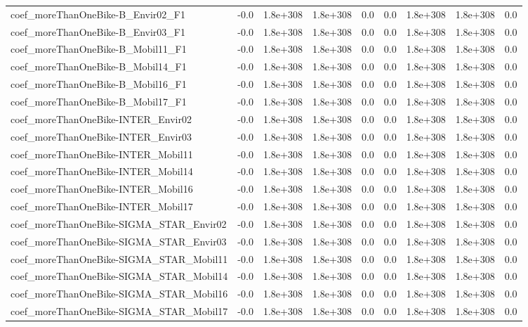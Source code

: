 \begin{tabular}{lrrrrrrrr}
coef_moreThanOneBike-B_Envir02_F1 & -0.0 & 1.8e+308 & 1.8e+308 & 0.0 & 0.0 & 1.8e+308 & 1.8e+308 & 0.0 \\
coef_moreThanOneBike-B_Envir03_F1 & -0.0 & 1.8e+308 & 1.8e+308 & 0.0 & 0.0 & 1.8e+308 & 1.8e+308 & 0.0 \\
coef_moreThanOneBike-B_Mobil11_F1 & -0.0 & 1.8e+308 & 1.8e+308 & 0.0 & 0.0 & 1.8e+308 & 1.8e+308 & 0.0 \\
coef_moreThanOneBike-B_Mobil14_F1 & -0.0 & 1.8e+308 & 1.8e+308 & 0.0 & 0.0 & 1.8e+308 & 1.8e+308 & 0.0 \\
coef_moreThanOneBike-B_Mobil16_F1 & -0.0 & 1.8e+308 & 1.8e+308 & 0.0 & 0.0 & 1.8e+308 & 1.8e+308 & 0.0 \\
coef_moreThanOneBike-B_Mobil17_F1 & -0.0 & 1.8e+308 & 1.8e+308 & 0.0 & 0.0 & 1.8e+308 & 1.8e+308 & 0.0 \\
coef_moreThanOneBike-INTER_Envir02 & -0.0 & 1.8e+308 & 1.8e+308 & 0.0 & 0.0 & 1.8e+308 & 1.8e+308 & 0.0 \\
coef_moreThanOneBike-INTER_Envir03 & -0.0 & 1.8e+308 & 1.8e+308 & 0.0 & 0.0 & 1.8e+308 & 1.8e+308 & 0.0 \\
coef_moreThanOneBike-INTER_Mobil11 & -0.0 & 1.8e+308 & 1.8e+308 & 0.0 & 0.0 & 1.8e+308 & 1.8e+308 & 0.0 \\
coef_moreThanOneBike-INTER_Mobil14 & -0.0 & 1.8e+308 & 1.8e+308 & 0.0 & 0.0 & 1.8e+308 & 1.8e+308 & 0.0 \\
coef_moreThanOneBike-INTER_Mobil16 & -0.0 & 1.8e+308 & 1.8e+308 & 0.0 & 0.0 & 1.8e+308 & 1.8e+308 & 0.0 \\
coef_moreThanOneBike-INTER_Mobil17 & -0.0 & 1.8e+308 & 1.8e+308 & 0.0 & 0.0 & 1.8e+308 & 1.8e+308 & 0.0 \\
coef_moreThanOneBike-SIGMA_STAR_Envir02 & -0.0 & 1.8e+308 & 1.8e+308 & 0.0 & 0.0 & 1.8e+308 & 1.8e+308 & 0.0 \\
coef_moreThanOneBike-SIGMA_STAR_Envir03 & -0.0 & 1.8e+308 & 1.8e+308 & 0.0 & 0.0 & 1.8e+308 & 1.8e+308 & 0.0 \\
coef_moreThanOneBike-SIGMA_STAR_Mobil11 & -0.0 & 1.8e+308 & 1.8e+308 & 0.0 & 0.0 & 1.8e+308 & 1.8e+308 & 0.0 \\
coef_moreThanOneBike-SIGMA_STAR_Mobil14 & -0.0 & 1.8e+308 & 1.8e+308 & 0.0 & 0.0 & 1.8e+308 & 1.8e+308 & 0.0 \\
coef_moreThanOneBike-SIGMA_STAR_Mobil16 & -0.0 & 1.8e+308 & 1.8e+308 & 0.0 & 0.0 & 1.8e+308 & 1.8e+308 & 0.0 \\
coef_moreThanOneBike-SIGMA_STAR_Mobil17 & -0.0 & 1.8e+308 & 1.8e+308 & 0.0 & 0.0 & 1.8e+308 & 1.8e+308 & 0.0 \\

\end{tabular}
